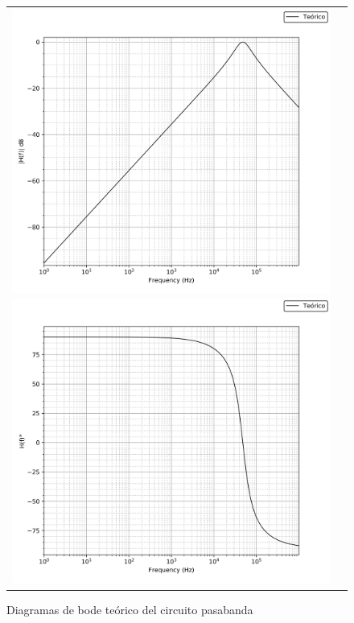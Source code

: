 \begin{figure}[H]
    \centering
    \begin{tabular}{c c}
        \includegraphics[scale=0.4]{Recursos/bode_teorico_pasabanda_modulo.png}
        \includegraphics[scale=0.4]{Recursos/bode_teorico_pasabanda_fase.png}
    \end{tabular}
    \caption{Diagramas de bode te\'orico del circuito pasabanda}
    \label{fig:bode_pasabanda_teorico}
\end{figure}

